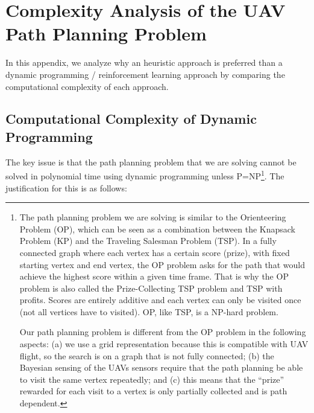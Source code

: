 \chapter{Complexity Analysis of the UAV Path Planning Problem}
\label{chap:complexity}

In this appendix, we analyze why an heuristic approach is preferred than a dynamic programming / reinforcement learning approach by comparing the computational complexity of each approach.

\section{Computational Complexity of Dynamic Programming}
\label{DPComplexity}

The key issue is that the path planning problem that we are solving cannot be solved in polynomial time using dynamic programming unless P=NP\footnote{The path planning problem we are solving is similar to the Orienteering Problem (OP), which can be seen as a combination between the Knapsack Problem (KP) and the Traveling Salesman Problem (TSP). In a fully connected graph where each vertex has a certain score (prize), with fixed starting vertex and end vertex, the OP problem asks for the path that would achieve the highest score within a given time frame. That is why the OP problem is also called the Prize-Collecting TSP problem and TSP with profits. Scores are entirely additive and each vertex can only be visited once (not all vertices have to visited). OP, like TSP, is a NP-hard problem.

Our path planning problem is different from the OP problem in the following aspects: (a) we use a grid representation because this is compatible with UAV flight, so the search is on a graph that is not fully connected; (b) the Bayesian sensing of the UAVs sensors require that the path planning be able to visit the same vertex repeatedly; and (c) this means that the ``prize'' rewarded for each visit to a vertex is only partially collected and is path dependent.}. The justification for this is as follows:

